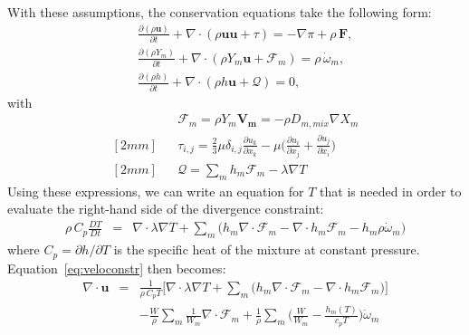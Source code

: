 With these assumptions, the conservation equations take the following form:
\begin{eqnarray}
&&\frac{\partial (\rho \boldsymbol{u})}{\partial t} + 
\nabla \cdot \left(\rho  \boldsymbol{u} \boldsymbol{u} + \tau \right)
= -\nabla \pi + \rho \, \boldsymbol{F}  ,
\nonumber
\\
&&\frac{\partial (\rho Y_m)}{\partial t} +
\nabla \cdot \left( \rho Y_m \boldsymbol{u} + \boldsymbol{\mathcal{F}}_{m} \right)
= \rho \, \dot{\omega}_m,
\label{eq:pelelm}
\\
&&\frac{ \partial (\rho h)}{ \partial t} +
\nabla \cdot \left( \rho h \boldsymbol{u} + \boldsymbol{\mathcal{Q}} \right) = 0 ,
\nonumber
\end{eqnarray}
with
 \begin{eqnarray*}
&&\boldsymbol{\mathcal{F}}_{m} = \rho Y_m \boldsymbol{V_m} = - \rho D_{m,mix} \nabla X_m
\\ [2mm]
&&\tau_{i,j} = \frac{2}{3} \mu \delta_{i,j} \frac{\partial {u_k}}{\partial x_k} - \mu \Big(\frac{\partial  u_i}{\partial x_j} + \frac{\partial  u_j}{\partial x_i}\Big)
\\ [2mm]
&&\boldsymbol{\mathcal{Q}} =  \sum_m h_m \boldsymbol{\mathcal{F}}_{m}  - \lambda \nabla T
 \end{eqnarray*}
 Using these expressions, we can write an equation for $T$ that is needed in order to evaluate the right-hand side of the divergence constraint:
 \begin{eqnarray}
   \rho \, C_p \frac{DT}{Dt} &=& \nabla \cdot \lambda \nabla T 
   + \sum_m \Big( h_m \nabla \cdot \boldsymbol{\mathcal{F}}_{m}
   - \nabla \cdot h_m \boldsymbol{\mathcal{F}}_{m}
   - h_m \rho \dot\omega_m \Big)
   \label{eq:T}
 \end{eqnarray}
where $C_p = \partial h/\partial T$ is the specific heat of the mixture at constant pressure. Equation~\ref{eq:veloconstr} then becomes:
\begin{eqnarray}
  \nabla \cdot \boldsymbol{u} &=&\frac{1}{\rho \, C_p T}\Big[ \nabla \cdot \lambda \nabla T
  + \sum_m \Big( h_m \nabla \cdot \boldsymbol{\mathcal{F}}_{m}  - \nabla \cdot h_m \boldsymbol{\mathcal{F}}_{m}\Big) \Big] \nonumber
\\
&&- \frac{W}{\rho} \sum_m \frac{1}{W_m} \nabla \cdot \boldsymbol{\mathcal{F}}_{m} + \frac{1}{\rho} \sum_m \Big( \frac{W}{W_m} -\frac{h_m(T)}{c_{p} T} \Big)\dot{\omega}_m
\label{eq:igldivu}
\end{eqnarray}



